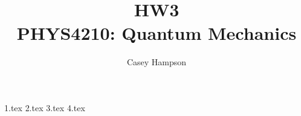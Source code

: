 \documentclass[titlepage]{article}
\title{HW3 \\[5pt] PHYS4210: Quantum Mechanics}
\author{Casey Hampson}
\begin{document}
    \maketitle
    \pagebreak

    {1.tex}
    {2.tex}
    {3.tex}
    {4.tex}
\end{document}
